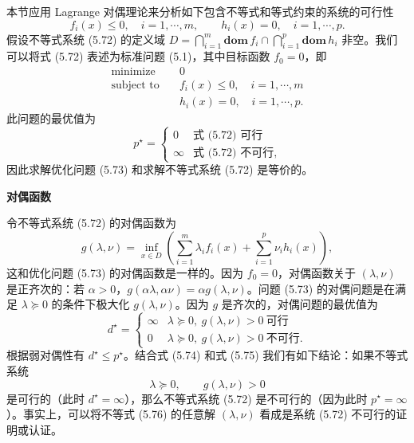 \documentclass[UTF8, 12pt, fontset=fandol, oneside]{ctexart}
\begin{document}
本节应用 Lagrange 对偶理论来分析如下包含不等式和等式约束的系统的可行性
\begin{equation}
f_i(x)\leq 0,\quad i=1,\cdots,m,\qquad h_i(x)=0,\quad i=1,\cdots,p.
\tag{5.72}
\end{equation}
假设不等式系统 (5.72) 的定义域 $D=\bigcap_{i=1}^m\mathbf{dom}\,f_i\cap\bigcap_{i=1}^p\mathbf{dom}\,h_i$ 非空。我们可以将式 (5.72) 表述为标准问题 (5.1)，其中目标函数 $f_0=0$，即
\begin{equation}
\begin{aligned}
\text{minimize}\quad & 0\\
\text{subject to}\quad & f_i(x)\leq 0,\quad i=1,\cdots,m\\
& h_i(x)=0,\quad i=1,\cdots,p.
\end{aligned}
\tag{5.73}
\end{equation}
此问题的最优值为
\begin{equation}
p^\star=
\begin{cases}
0 & \text{式 (5.72) 可行}\\
\infty & \text{式 (5.72) 不可行},
\end{cases}
\tag{5.74}
\end{equation}
因此求解优化问题 (5.73) 和求解不等式系统 (5.72) 是等价的。

\noindent\textbf{对偶函数}

令不等式系统 (5.72) 的对偶函数为
\[
g(\lambda,\nu)=\inf_{x\in D}\left(\sum_{i=1}^m\lambda_i f_i(x)+\sum_{i=1}^p\nu_i h_i(x)\right),
\]
这和优化问题 (5.73) 的对偶函数是一样的。因为 $f_0=0$，对偶函数关于 $(\lambda,\nu)$ 是正齐次的：若 $\alpha>0$，$g(\alpha\lambda,\alpha\nu)=\alpha g(\lambda,\nu)$。问题 (5.73) 的对偶问题是在满足 $\lambda\succeq 0$ 的条件下极大化 $g(\lambda,\nu)$。因为 $g$ 是齐次的，对偶问题的最优值为
\begin{equation}
d^\star=
\begin{cases}
\infty & \lambda\succeq 0,\ g(\lambda,\nu)>0\ \text{可行}\\
0 & \lambda\succeq 0,\ g(\lambda,\nu)>0\ \text{不可行}.
\end{cases}
\tag{5.75}
\end{equation}
根据弱对偶性有 $d^\star\leq p^\star$。结合式 (5.74) 和式 (5.75) 我们有如下结论：如果不等式系统
\begin{equation}
\lambda\succeq 0,\qquad g(\lambda,\nu)>0
\tag{5.76}
\end{equation}
是可行的（此时 $d^\star=\infty$），那么不等式系统 (5.72) 是不可行的（因为此时 $p^\star=\infty$）。事实上，可以将不等式 (5.76) 的任意解 $(\lambda,\nu)$ 看成是系统 (5.72) 不可行的证明或认证。
\end{document}
